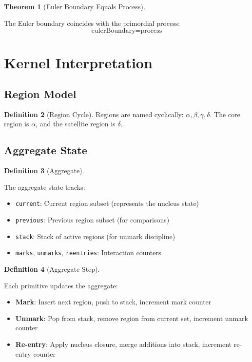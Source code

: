 \documentclass{amsart}
\theoremstyle{definition}
\newtheorem{definition}{Definition}[section]
\newtheorem{theorem}[definition]{Theorem}
\theoremstyle{remark}
\begin{document}
\begin{theorem}[Euler Boundary Equals Process]
\label{thm:euler-eq-process}
\leanok
{}

The Euler boundary coincides with the primordial process:
\[
\text{eulerBoundary} = \text{process}
\]
\end{theorem}

\section{Kernel Interpretation}

\subsection{Region Model}
\label{sec:region-model}

\begin{definition}[Region Cycle]
\label{def:region-cycle}
Regions are named cyclically: $\alpha, \beta, \gamma, \delta$. The core region is $\alpha$, and the satellite region is $\delta$.
\end{definition}

\subsection{Aggregate State}
\label{sec:aggregate}

\begin{definition}[Aggregate]
\label{def:aggregate}

The aggregate state tracks:
\begin{itemize}
\item \texttt{current}: Current region subset (represents the nucleus state)
\item \texttt{previous}: Previous region subset (for comparisons)
\item \texttt{stack}: Stack of active regions (for unmark discipline)
\item \texttt{marks}, \texttt{unmarks}, \texttt{reentries}: Interaction counters
\end{itemize}
\end{definition}

\begin{definition}[Aggregate Step]
\label{def:aggregate-step}

Each primitive updates the aggregate:
\begin{itemize}
\item \textbf{Mark}: Insert next region, push to stack, increment mark counter
\item \textbf{Unmark}: Pop from stack, remove region from current set, increment unmark counter
\item \textbf{Re-entry}: Apply nucleus closure, merge additions into stack, increment re-entry counter
\end{itemize}
\end{definition}
\end{document}
